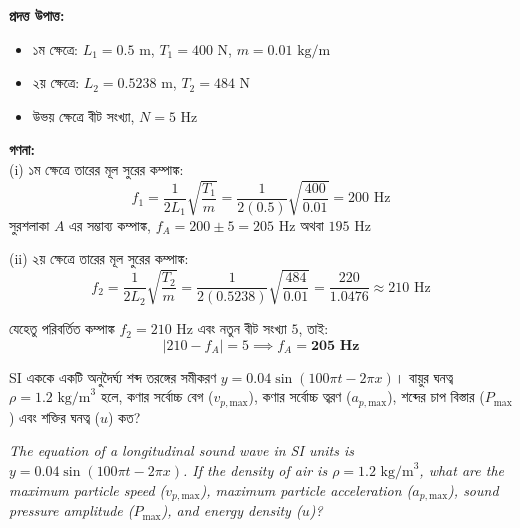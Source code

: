 \documentclass[12pt, a4paper]{article}
\begin{document}
\begin{tcolorbox}[solutionbox={সমাধান (Solution)}]
    \noindent
    \textbf{প্রদত্ত উপাত্ত:}
    \begin{itemize}[leftmargin=1.5em, itemsep=0.2em]
        \item ১ম ক্ষেত্রে: $L_1 = 0.5\text{ m}$, $T_1 = 400\text{ N}$, $m = 0.01\text{ kg/m}$
        \item ২য় ক্ষেত্রে: $L_2 = 0.5238\text{ m}$, $T_2 = 484\text{ N}$
        \item উভয় ক্ষেত্রে বীট সংখ্যা, $N = 5\text{ Hz}$
    \end{itemize}

    \vspace{0.6em}
    \noindent\textbf{গণনা:} \\
    (i) ১ম ক্ষেত্রে তারের মূল সুরের কম্পাঙ্ক:
    \[ f_1 = \frac{1}{2 L_1} \sqrt{\frac{T_1}{m}} = \frac{1}{2(0.5)} \sqrt{\frac{400}{0.01}} = 200\text{ Hz} \]
    সুরশলাকা $A$ এর সম্ভাব্য কম্পাঙ্ক, $f_A = 200 \pm 5 = 205\text{ Hz}$ অথবা $195\text{ Hz}$
    
    (ii) ২য় ক্ষেত্রে তারের মূল সুরের কম্পাঙ্ক:
    \[ f_2 = \frac{1}{2 L_2} \sqrt{\frac{T_2}{m}} = \frac{1}{2(0.5238)} \sqrt{\frac{484}{0.01}} = \frac{220}{1.0476} \approx 210\text{ Hz} \]
    
    যেহেতু পরিবর্তিত কম্পাঙ্ক $f_2 = 210\text{ Hz}$ এবং নতুন বীট সংখ্যা $5$, তাই:
    \[ |210 - f_A| = 5 \implies f_A = \mathbf{205\text{ Hz}} \]
\end{tcolorbox}


\begin{tcolorbox}[questionbox={প্রশ্ন (Question) 22}]
    \noindent
    SI এককে একটি অনুদৈর্ঘ্য শব্দ তরঙ্গের সমীকরণ $y = 0.04 \sin(100\pi t - 2\pi x)$। বায়ুর ঘনত্ব $\rho = 1.2\text{ kg/m}^3$ হলে, কণার সর্বোচ্চ বেগ ($v_{p,\text{max}}$), কণার সর্বোচ্চ ত্বরণ ($a_{p,\text{max}}$), শব্দের চাপ বিস্তার ($P_{\text{max}}$) এবং শক্তির ঘনত্ব ($u$) কত?
    
    \vspace{0.8em}
    \begin{english}
    \noindent\textit{\color{darkgray}
    The equation of a longitudinal sound wave in SI units is $y = 0.04 \sin(100\pi t - 2\pi x)$. If the density of air is $\rho = 1.2\text{ kg/m}^3$, what are the maximum particle speed ($v_{p,\text{max}}$), maximum particle acceleration ($a_{p,\text{max}}$), sound pressure amplitude ($P_{\text{max}}$), and energy density ($u$)?
    }
    \end{english}
\end{tcolorbox}
\end{document}
